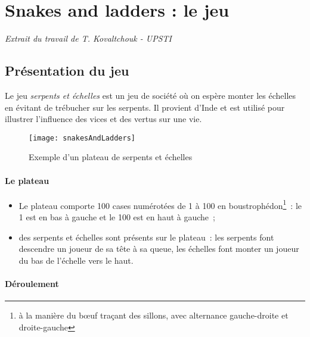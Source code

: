 
\section{Snakes and ladders : le jeu}

\textit{Extrait du travail de T. Kovaltchouk - UPSTI}


\subsection{Présentation du jeu}

Le jeu \emph{serpents et échelles} est un jeu de société où on espère monter les échelles en évitant de trébucher sur les serpents. Il provient d'Inde et est utilisé pour illustrer l'influence des vices et des vertus sur une vie.

\begin{figure}[h]
	\begin{center}
		\texttt{[image: snakesAndLadders]}
	\end{center}
	\caption{Exemple d'un plateau de serpents et échelles}
	\label{fig:1}
\end{figure}

\paragraph*{Le plateau}

\begin{itemize}
	\item Le plateau comporte 100 cases numérotées de 1 à 100 en boustrophédon\footnote{à la manière du bœuf traçant des sillons, avec alternance gauche-droite et droite-gauche}~: le 1 est en bas à gauche et le 100 est en haut à gauche~;
	\item des serpents et échelles sont présents sur le plateau~: les serpents font descendre un joueur de sa tête à sa queue, les échelles font monter un joueur du bas de l'échelle vers le haut.
\end{itemize}

\paragraph*{Déroulement}

